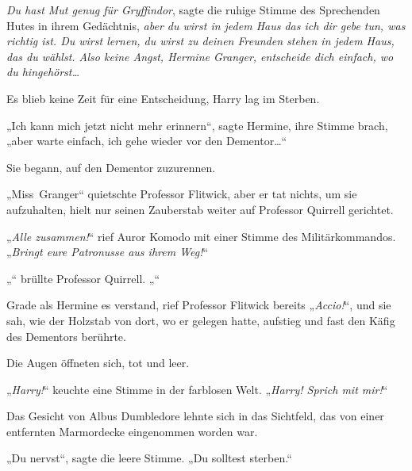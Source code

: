 \emph{Du hast Mut genug für Gryffindor}, sagte die ruhige Stimme des Sprechenden Hutes in ihrem Gedächtnis, \emph{aber du wirst in jedem Haus das ich dir gebe tun, was richtig ist. Du wirst lernen, du wirst zu deinen Freunden stehen in jedem Haus, das du wählst. Also keine Angst, Hermine Granger, entscheide dich einfach, wo du hingehörst…}

Es blieb keine Zeit für eine Entscheidung, Harry lag im Sterben.

„Ich kann mich jetzt nicht mehr erinnern“, sagte Hermine, ihre Stimme brach, „aber warte einfach, ich gehe wieder vor den Dementor…“

Sie begann, auf den Dementor zuzurennen.

„Miss~Granger“ quietschte Professor Flitwick, aber er tat nichts, um sie aufzuhalten, hielt nur seinen Zauberstab weiter auf Professor Quirrell gerichtet.

„\emph{Alle zusammen!}“ rief Auror Komodo mit einer Stimme des Militärkommandos. „\emph{Bringt eure Patronusse aus ihrem Weg!}“

„“ brüllte Professor Quirrell. „“

Grade als Hermine es verstand, rief Professor Flitwick bereits „\emph{Accio!}“, und sie sah, wie der Holzstab von dort, wo er gelegen hatte, aufstieg und fast den Käfig des Dementors berührte.

\later

Die Augen öffneten sich, tot und leer.

„\emph{Harry!}“ keuchte eine Stimme in der farblosen Welt. „\emph{Harry! Sprich mit mir!}“

Das Gesicht von Albus Dumbledore lehnte sich in das Sichtfeld, das von einer entfernten Marmordecke eingenommen worden war.

„Du nervst“, sagte die leere Stimme. „Du solltest sterben.“


